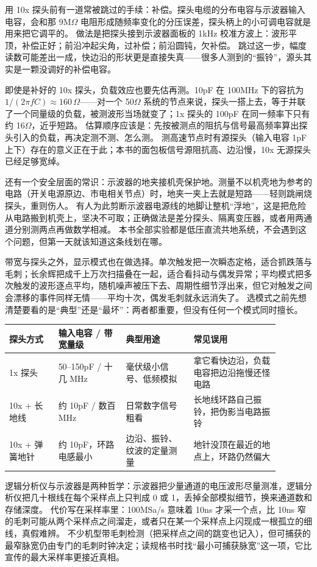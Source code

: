 用 10x 探头前有一道常被跳过的手续：补偿。探头电缆的分布电容与示波器输入电容，会和那 9M$\Omega$ 电阻形成随频率变化的分压误差，探头柄上的小可调电容就是用来把它调平的。
做法是把探头接到示波器面板的 1kHz 校准方波上：波形平顶，补偿正好；前沿冲起尖角，过补偿；前沿圆钝，欠补偿。
跳过这一步，幅度读数可能差出一成，快边沿的形状更是直接失真——很多人测到的“振铃”，源头其实是一颗没调好的补偿电容。

即使是补好的 10x 探头，负载效应也要先估再测。10pF 在 100MHz 下的容抗为 $1/(2\pi f C) \approx 160\,\Omega$——对一个 50$\Omega$ 系统的节点来说，探头一搭上去，等于并联了一个同量级的负载，被测波形当场就变了；1x 探头的 100pF 在同一频率下只有约 16$\Omega$，近乎短路。
估算顺序应该是：先按被测点的阻抗与信号最高频率算出探头引入的负载，再决定测不测、怎么测。
测高速节点时有源探头（输入电容 1pF 上下）存在的意义正在于此；本书的面包板信号源阻抗高、边沿慢，10x 无源探头已经足够宽绰。

还有一个安全层面的常识：示波器的地夹接机壳保护地。测量不以机壳地为参考的电路（开关电源原边、市电相关节点）时，地夹一夹上去就是短路——轻则跳闸烧探头，重则伤人。
有人为此剪断示波器电源线的地脚让整机“浮地”，这是把危险从电路搬到机壳上，坚决不可取；正确做法是差分探头、隔离变压器，或者用两通道分别测两点再做数学相减。
本书全部实验都是低压直流共地系统，不会遇到这个问题，但第一天就该知道这条线划在哪。

带宽与探头之外，显示模式也在做选择。单次触发把一次瞬态定格，适合抓跌落与毛刺；长余辉把成千上万次扫描叠在一起，适合看抖动与偶发异常；平均模式把多次触发的波形逐点平均，随机噪声被压下去、周期性细节浮出来，但它对触发之间会漂移的事件同样无情——平均十次，偶发毛刺就永远消失了。
选模式之前先想清楚要看的是“典型”还是“最坏”：两者都重要，但没有任何一个模式同时擅长。

\begin{longtable}{L{0.16\linewidth}L{0.22\linewidth}L{0.22\linewidth}L{0.28\linewidth}}
\toprule
探头方式 & 输入电容 / 带宽量级 & 典型用途 & 常见误用 \\
\midrule
1x 探头 & 50--150pF / 十几 MHz & 毫伏级小信号、低频模拟 & 拿它看快边沿，负载电容把边沿拖慢还怪电路 \\\tablerowrule
10x + 长地线 & 约 10pF / 数百 MHz & 日常数字信号粗看 & 长地线环路自己振铃，把伪影当电路振铃 \\\tablerowrule
10x + 弹簧地针 & 约 10pF，环路电感最小 & 边沿、振铃、纹波的定量测量 & 地针没顶在最近的地点上，环路仍然偏大 \\
\bottomrule
\end{longtable}

逻辑分析仪与示波器是两种哲学：示波器把少量通道的电压波形尽量测准，逻辑分析仪把几十根线在每个采样点上只判成 0 或 1，丢掉全部模拟细节，换来通道数和存储深度。
代价写在采样率里：100MSa/s 意味着 10ns 才采一个点，比 10ns 窄的毛刺可能从两个采样点之间溜走，或者只在某一个采样点上闪现成一根孤立的细线，真假难辨。
不少机型带毛刺检测（把采样点之间的跳变也记入），但可捕获的最窄脉宽仍由专门的毛刺时钟决定；读规格书时找“最小可捕获脉宽”这一项，它比宣传的最大采样率更接近真相。

